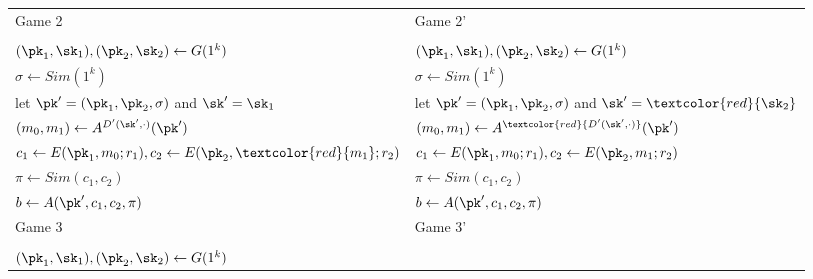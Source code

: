 \begin{table}[t!]
\begin{tabular}{l|l}
            \hline
            Game 2                                                                                &
            Game 2'                                                                                 \\
                                                                                                  & \\
            $(\pk_1,\sk_1),(\pk_2,\sk_2) \leftarrow G(1^k)$                                       &
            $(\pk_1,\sk_1),(\pk_2,\sk_2) \leftarrow G(1^k)$                                         \\
            $\sigma \leftarrow {Sim(1^k)}$                                                        &
            $\sigma \leftarrow {Sim(1^k)}$                                                          \\
            let $\pk'=(\pk_1,\pk_2,\sigma)$ and $\sk'={\sk_1}$                                    &
            let $\pk'=(\pk_1,\pk_2,\sigma)$ and $\sk'=\textcolor{red}{\sk_2}$                       \\
            $(m_0,m_1) \leftarrow A^{D'(\sk',\cdot)}(\pk')$                                       &
            $(m_0,m_1) \leftarrow A^{\textcolor{red}{D'(\sk',\cdot)}}(\pk')$                        \\
            $c_1 \leftarrow E(\pk_1,{m_0};r_1), c_2 \leftarrow E(\pk_2,\textcolor{red}{m_1};r_2)$ &
            $c_1 \leftarrow E(\pk_1,{m_0};r_1), c_2 \leftarrow E(\pk_2,{m_1};r_2)$                  \\
            $\pi \leftarrow {Sim(c_1,c_2)}$                                                       &
            $\pi \leftarrow {Sim(c_1,c_2)}$                                                         \\
            $b \leftarrow A(\pk',c_1,c_2,\pi)$                                                    &
            $b \leftarrow A(\pk',c_1,c_2,\pi)$                                                      \\
            \hline
            Game 3                                                                                &
            Game 3'                                                                                 \\
                                                                                                  & \\
            $(\pk_1,\sk_1),(\pk_2,\sk_2) \leftarrow G(1^k)$                                       &

\end{tabular}
\end{table}
